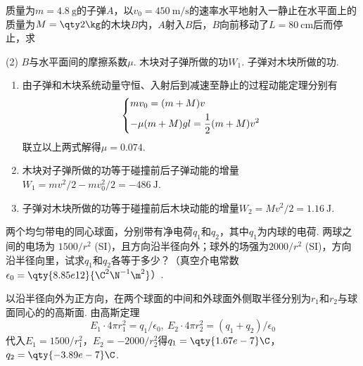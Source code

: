 \begin{problem}
    质量为$m=\qty{4.8}\g$的子弹$A$，以$v_0=\qty{450}{\m/\s}$的速率水平地射入一静止在水平面上的质量为$M=\qty2\kg$的木块$B$内，$A$射入$B$后，$B$向前移动了$L=\qty{80}\cm$后而停止，求
    \begin{tasks}[label=\arabic*.](2)
        \task $B$与水平面间的摩擦系数$\mu$.
        \task 木块对子弹所做的功$W_1$.
        \task 子弹对木块所做的功.
    \end{tasks}
\end{problem}
\begin{solution}\leavevmode
    \begin{enumerate}
        \item 由子弹和木块系统动量守恒、入射后到减速至静止的过程动能定理分别有
        \[\begin{dcases}
            mv_0=(m+M)v\\
            -\mu(m+M)gl=\frac12(m+M)v^2
        \end{dcases}\]
        联立以上两式解得$\mu=0.074$.
        \item 木块对子弹所做的功等于碰撞前后子弹动能的增量$W_1=mv^2/2-mv_0^2/2=\qty{-486}\J$.
        \item 子弹对木块所做的功等于碰撞前后木块动能的增量$W_2=Mv^2/2=\qty{1.16}\J$.
    \end{enumerate}
\end{solution}

\begin{problem}
    两个均匀带电的同心球面，分别带有净电荷$q_1$和$q_2$，其中$q_1$为内球的电荷. 两球之间的电场为 $1500/r^2$ (SI)，且方向沿半径向外；球外的场强为$2000/r^2$ (SI)，方向沿半径向里，试求$q_1$和$q_2$各等于多少？（真空介电常数$\epsilon_0=\qty{8.85e12}{\C^2\N^{-1}\m^2}$）.
\end{problem}
\begin{solution}
    以沿半径向外为正方向，在两个球面的中间和外球面外侧取半径分别为$r_1$和$r_2$与球面同心的的高斯面. 由高斯定理
    \[E_1\cdot 4\pi r_1^2=q_1/\epsilon_0,\ E_2\cdot 4\pi r_2^2=(q_1+q_2)/\epsilon_0\]
    代入$E_1=1500/r_1^2$，$E_2=-2000/r_2^2$得$q_1=\qty{1.67e-7}\C$，$q_2=\qty{-3.89e-7}\C$.
\end{solution}

